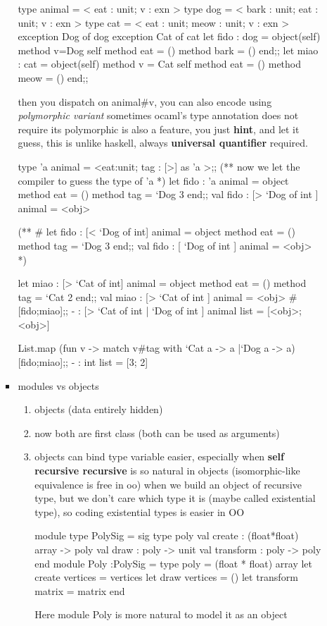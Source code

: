 \begin{enumerate}[(a)]
\begin{itemize}
\begin{itemize}
\begin{bluecode}
type animal = < eat : unit; v : exn >
type dog = < bark : unit; eat : unit; v : exn >
type cat = < eat : unit; meow : unit; v : exn >
exception Dog of dog
exception Cat of cat 
let fido : dog = object(self) method v=Dog self method eat = () method bark = () end;;
let miao : cat = object(self) method v = Cat self method eat = () method meow = () end;;
\end{bluecode}


then you dispatch on animal\#v,  you can also encode using \textit{polymorphic variant}
sometimes ocaml's type annotation does not require its polymorphic is also
a feature, you just \textbf{hint}, and let it guess, this is
unlike haskell, always \textbf{universal quantifier} required.

\begin{alternate}
type 'a animal = <eat:unit; tag : [>] as 'a >;;
(** now we let the compiler to guess the type of 'a *)
let fido : 'a animal = object method eat = () method tag = `Dog 3 end;;
val fido : [> `Dog of int ] animal = <obj>

(**
# let fido : [< `Dog of int] animal = object method eat = () method tag = `Dog 3 end;;
val fido : [ `Dog of int ] animal = <obj>
*)

let miao : [> `Cat of int] animal = object method eat = () method tag = `Cat 2 end;;
val miao : [> `Cat of int ] animal = <obj>
# [fido;miao];;
- : [> `Cat of int | `Dog of int ] animal list = [<obj>; <obj>]


List.map (fun v -> match v#tag with `Cat a -> a |`Dog a -> a) [fido;miao];;
- : int list = [3; 2]
\end{alternate}

    \item modules vs objects
      \begin{enumerate}[(1)]
      \item objects (data entirely hidden)
      \item now both are first class (both can be used as arguments)
      \item objects can bind type variable easier, especially when \textbf{self recursive
        recursive} is so natural in objects (isomorphic-like equivalence is free in oo)
        when we build an object of recursive type, but we don't care which type it is
        (maybe called existential type), so coding existential types is easier in OO
\begin{redcode}
module type PolySig = sig
type poly
val create : (float*float) array -> poly
val draw : poly -> unit
val transform : poly -> poly 
end 
module Poly :PolySig =
type poly = (float * float) array
let create vertices = vertices
let draw vertices = ()
let transform matrix = matrix 
end
\end{redcode}
Here module Poly is more natural to model it as an object


\end{enumerate}
\end{itemize}
\end{itemize}
\end{enumerate}
